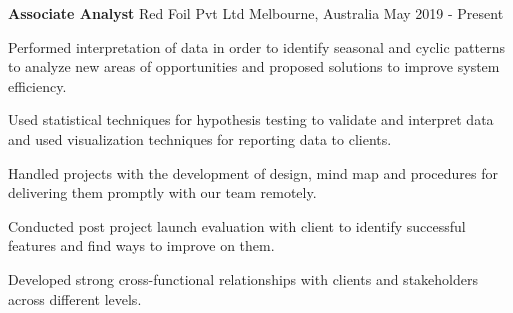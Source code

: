 

\begin{cventries}

    \cventry
    {\textbf{Associate Analyst}} %
    {Red Foil Pvt Ltd} %
    {Melbourne, Australia} %
    {May 2019 - Present} %
    {
      \begin{cvitems} %
      \normalsize{\item {Performed interpretation of data in order to identify seasonal and cyclic patterns to analyze new areas of opportunities and proposed solutions to improve system efficiency.}
      \item {Used statistical techniques for hypothesis testing to validate and interpret data and used visualization techniques for reporting data to clients.}
      \item {Handled projects with the development of design, mind map and procedures for delivering them promptly with our team remotely.}
      \item{Conducted post project launch evaluation with client to identify successful features and find ways to improve on them.}
      \item {Developed strong cross-functional relationships with clients and stakeholders across different levels.}}
      \end{cvitems}
    }
    

\end{cventries}
